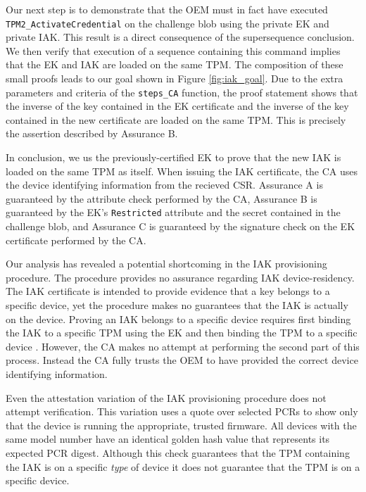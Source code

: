 \documentclass[runningheads]{llncs}
\begin{document}
Our next step is to demonstrate that the OEM must in fact have
executed \verb|TPM2_ActivateCredential| on the challenge blob using
the private EK and private IAK. This result is a direct consequence of
the supersequence conclusion. We then verify that execution of a
sequence containing this command implies that the EK and IAK are
loaded on the same TPM.  The composition of these small proofs leads
to our goal shown in Figure \ref{fig:iak_goal}.  Due to the extra
parameters and criteria of the \verb|steps_CA| function, the proof
statement shows that the inverse of the key contained in the EK
certificate and the inverse of the key contained in the new
certificate are loaded on the same TPM. This is precisely the
assertion described by Assurance B.

In conclusion, we us the previously-certified EK to prove that the new
IAK is loaded on the same TPM as itself. When issuing the IAK
certificate, the CA uses the device identifying information from the
recieved CSR.  Assurance A is guaranteed by the attribute check
performed by the CA, Assurance B is guaranteed by the EK's
\verb|Restricted| attribute and the secret contained in the challenge
blob, and Assurance C is guaranteed by the signature check on the EK
certificate performed by the CA.

Our analysis has revealed a potential shortcoming in the IAK
provisioning procedure. The procedure provides no assurance regarding
IAK device-residency.  The IAK certificate is intended to provide
evidence that a key belongs to a specific device, yet the procedure
makes no guarantees that the IAK is actually on the device.  Proving
an IAK belongs to a specific device requires first binding the IAK to
a specific TPM using the EK and then binding the TPM to a specific
device \citep{DevIDSpec-TCG}.  However, the CA makes no attempt at
performing the second part of this process. Instead the CA fully
trusts the OEM to have provided the correct device identifying
information.

Even the attestation variation of the IAK provisioning procedure does
not attempt verification. This variation uses a quote over selected
PCRs to show only that the device is running the appropriate, trusted
firmware. All devices with the same model number have an identical
golden hash value that represents its expected PCR digest.  Although
this check guarantees that the TPM containing the IAK is on a specific
\textit{type} of device it does not guarantee that the TPM is on a
specific device.
\end{document}
